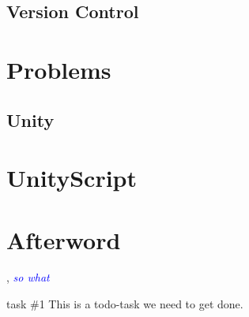 \documentclass[BSP,english,oneside]{classes/gucthesis}
\newcommand{\comment}[1]{\textcolor{blue}{\emph{#1}}}
\newcommand{\todo}[1]{{\color{green}#1}}
\begin{document}
	\section{Version Control}
	


\chapter{Problems}
	\label{chap:problems}
	\section{Unity}
	

\chapter{UnityScript}
	

\chapter{Afterword}
	\label{chap:afterword}
	




\appendix %
\appendixpage
\addappheadtotoc







\GUC, 
\comment{so what}

\todo{task \#1}
This is a todo-task we need to get done.
\end{document}
